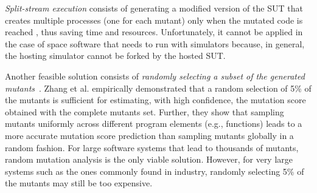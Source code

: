 \emph{Split-stream execution} consists of generating a modified version of the SUT that creates multiple processes (one for each mutant) only when the mutated code is reached \cite{king1991fortran,tokumoto2016muvm}, thus saving time and resources. Unfortunately, it cannot be applied in the case of space software that needs to run with simulators because, in general, the hosting simulator cannot be forked by the hosted SUT.

Another feasible solution consists of  \emph{randomly selecting a subset of the generated mutants}~\cite{zhang2010operator,gopinath2015hard,zhang2013operator}. 
Zhang et al. \cite{zhang2013operator} empirically demonstrated that a random selection of 5\% of the mutants is sufficient for 
estimating, with high confidence, the mutation score obtained with the complete mutants set.
Further,
they show that sampling mutants uniformly across different program elements (e.g., functions) 
leads to a more accurate mutation score prediction than sampling mutants globally in a random fashion. 
For large software systems that lead to thousands of mutants, random mutation analysis is the only viable solution. However, for very large systems such as the ones commonly found in industry, randomly selecting 5\% of the mutants may still be too expensive.


